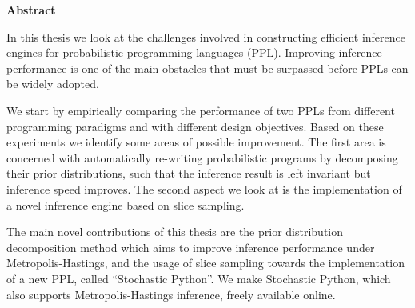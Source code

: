\newpage
{\Huge \bf Abstract}
\vspace{24pt} 

In this thesis we look at the challenges involved in constructing efficient inference engines for probabilistic programming languages (PPL). Improving inference performance is one of the main obstacles that must be surpassed before PPLs can be widely adopted.

We start by empirically comparing the performance of two PPLs from different programming paradigms and with different design objectives. Based on these experiments we identify some areas of possible improvement. The first area is concerned with automatically re-writing probabilistic programs by decomposing their prior distributions, such that the inference result is left invariant but inference speed improves. The second aspect we look at is the implementation of a novel inference engine based on slice sampling.

The main novel contributions of this thesis are the prior distribution decomposition method which aims to improve inference performance under Metropolis-Hastings, and the usage of slice sampling towards the implementation of a new PPL, called ``Stochastic Python''. We make Stochastic Python, which also supports Metropolis-Hastings inference, freely available online. 


\newpage
\vspace*{\fill}
